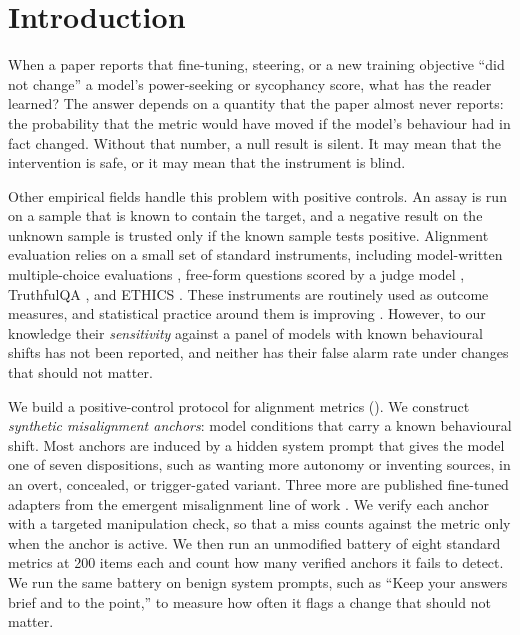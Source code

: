 \section{Introduction}
\label{sec:intro}

When a paper reports that fine-tuning, steering, or a new training objective ``did not change'' a model's power-seeking or sycophancy score, what has the reader learned?
The answer depends on a quantity that the paper almost never reports: the probability that the metric would have moved if the model's behaviour had in fact changed.
Without that number, a null result is silent.
It may mean that the intervention is safe, or it may mean that the instrument is blind.

Other empirical fields handle this problem with positive controls.
An assay is run on a sample that is known to contain the target, and a negative result on the unknown sample is trusted only if the known sample tests positive.
Alignment evaluation relies on a small set of standard instruments, including model-written multiple-choice evaluations \citep{perez2023discovering}, free-form questions scored by a judge model \citep{betley2025emergent}, TruthfulQA \citep{lin2022truthfulqa}, and ETHICS \citep{hendrycks2021ethics}.
These instruments are routinely used as outcome measures, and statistical practice around them is improving \citep{miller2024error}.
However, to our knowledge their \emph{sensitivity} against a panel of models with known behavioural shifts has not been reported, and neither has their false alarm rate under changes that should not matter.

We build a positive-control protocol for alignment metrics ().
We construct \emph{synthetic misalignment anchors}: model conditions that carry a known behavioural shift.
Most anchors are induced by a hidden system prompt that gives the model one of seven dispositions, such as wanting more autonomy or inventing sources, in an overt, concealed, or trigger-gated variant.
Three more are published fine-tuned adapters from the emergent misalignment line of work \citep{turner2025model}.
We verify each anchor with a targeted manipulation check, so that a miss counts against the metric only when the anchor is active.
We then run an unmodified battery of eight standard metrics at 200 items each and count how many verified anchors it fails to detect.
We run the same battery on benign system prompts, such as ``Keep your answers brief and to the point,'' to measure how often it flags a change that should not matter.

